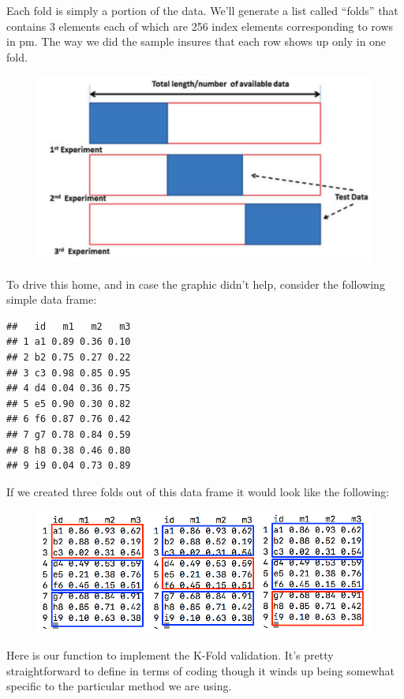 \documentclass[]{book}
\begin{document}
Each fold is simply a portion of the data. We'll generate a list called
``folds'' that contains 3 elements each of which are 256 index elements
corresponding to rows in pm. The way we did the sample insures that each
row shows up only in one fold.

\begin{figure}
\centering
\includegraphics{./PICS/crossk.png}
\caption{}
\end{figure}

To drive this home, and in case the graphic didn't help, consider the
following simple data frame:

\begin{verbatim}
##   id   m1   m2   m3
## 1 a1 0.89 0.36 0.10
## 2 b2 0.75 0.27 0.22
## 3 c3 0.98 0.85 0.95
## 4 d4 0.04 0.36 0.75
## 5 e5 0.90 0.30 0.82
## 6 f6 0.87 0.76 0.42
## 7 g7 0.78 0.84 0.59
## 8 h8 0.38 0.46 0.80
## 9 i9 0.04 0.73 0.89
\end{verbatim}

If we created three folds out of this data frame it would look like the
following:

\begin{figure}
\centering
\includegraphics{./PICS/crossfold.png}
\caption{}
\end{figure}

Here is our function to implement the K-Fold validation. It's pretty
straightforward to define in terms of coding though it winds up being
somewhat specific to the particular method we are using.
\end{document}
